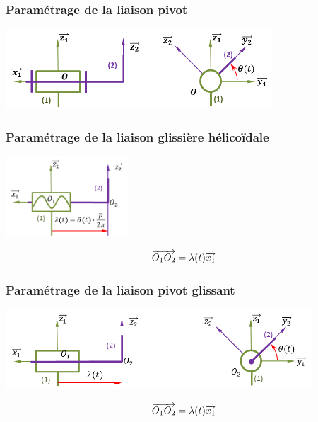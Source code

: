 \documentclass[10pt,oneside]{article}
\begin{document}
\subsubsection{Paramétrage de la liaison pivot}
\begin{minipage}[c]{.3\linewidth}
\begin{center}
\includegraphics[height=3cm]{png/pivot_p2}
\end{center}
\end{minipage} \hfill
\begin{minipage}[c]{.65\linewidth}

\end{minipage}
\subsubsection{Paramétrage de la liaison glissière hélicoïdale}
\begin{minipage}[c]{.3\linewidth}
\begin{center}
\includegraphics[height=3cm]{png/helico_p}
\end{center}
\end{minipage} \hfill
\begin{minipage}[c]{.65\linewidth}
$$
\overrightarrow{O_1 O_2} = \lambda(t) \overrightarrow{x_1}
$$
\end{minipage}

\subsubsection{Paramétrage de la liaison pivot glissant}
\begin{minipage}[c]{.3\linewidth}
\begin{center}
\includegraphics[height=3cm]{png/pivotg_p}
\end{center}
\end{minipage} \hfill
\begin{minipage}[c]{.65\linewidth}
$$
\overrightarrow{O_1 O_2} = \lambda(t) \overrightarrow{x_1}
$$
\end{minipage}
\end{document}
